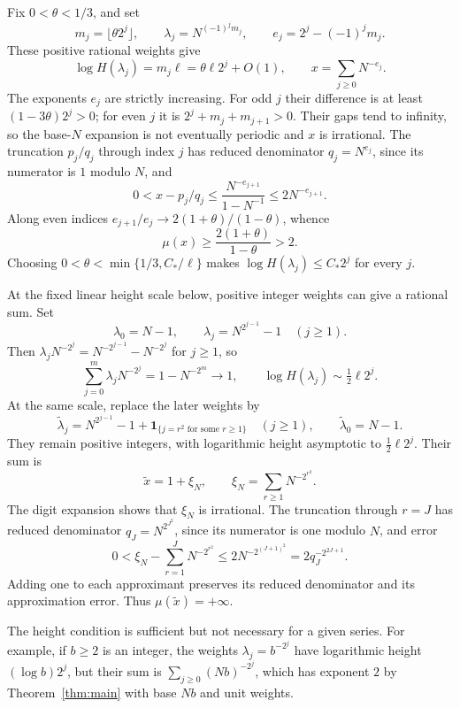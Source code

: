 \documentclass{amsart}
\numberwithin{equation}{section}
\begin{document}
Fix $0<\theta<1/3$, and set
\[
m_j=\lfloor\theta2^j\rfloor,\qquad
\lambda_j=N^{(-1)^jm_j},\qquad e_j=2^j-(-1)^jm_j.
\]
These positive rational weights give
\[
\log H(\lambda_j)=m_j\ell=\theta\ell2^j+O(1),\qquad
x=\sum_{j\ge0}N^{-e_j}.
\]
The exponents $e_j$ are strictly increasing. For odd $j$ their
difference is at least $(1-3\theta)2^j>0$; for even $j$ it is
$2^j+m_j+m_{j+1}>0$. Their gaps tend to infinity, so the base-$N$
expansion is not eventually periodic and $x$ is irrational.
The truncation $p_j/q_j$ through index $j$ has reduced denominator
$q_j=N^{e_j}$, since its numerator is $1$ modulo $N$, and
\[
0<x-p_j/q_j\le\frac{N^{-e_{j+1}}}{1-N^{-1}}
\le2N^{-e_{j+1}}.
\]
Along even indices $e_{j+1}/e_j\to2(1+\theta)/(1-\theta)$, whence
\begin{equation}\label{eq:sharpheight}
\mu(x)\ge\frac{2(1+\theta)}{1-\theta}>2.
\end{equation}
Choosing $0<\theta<\min\{1/3,C_*/\ell\}$ makes
$\log H(\lambda_j)\le C_*2^j$ for every $j$.

At the fixed linear height scale below, positive integer weights can give a
rational sum. Set
\[
\lambda_0=N-1,\qquad \lambda_j=N^{2^{j-1}}-1\quad(j\ge1).
\]
Then $\lambda_jN^{-2^j}=N^{-2^{j-1}}-N^{-2^j}$ for $j\ge1$, so
\[
\sum_{j=0}^m\lambda_jN^{-2^j}=1-N^{-2^m}\longrightarrow1,
\qquad \log H(\lambda_j)\sim\tfrac12\ell2^j.
\]
At the same scale, replace the later weights by
\[
\widetilde\lambda_j=N^{2^{j-1}}-1+
\boldsymbol1_{\{j=r^2\text{ for some }r\ge1\}}\quad(j\ge1),
\qquad\widetilde\lambda_0=N-1.
\]
They remain positive integers, with logarithmic height
asymptotic to $\tfrac12\ell2^j$. Their sum is
\[
\widetilde x=1+\xi_N,\qquad
\xi_N=\sum_{r\ge1}N^{-2^{r^2}}.
\]
The digit expansion shows that $\xi_N$ is irrational. The truncation
through $r=J$ has reduced denominator
$q_J=N^{2^{J^2}}$, since its numerator is one modulo $N$, and error
\[
0<\xi_N-\sum_{r=1}^JN^{-2^{r^2}}
\le2N^{-2^{(J+1)^2}}=2q_J^{-2^{2J+1}}.
\]
Adding one to each approximant preserves its reduced denominator and its
approximation error. Thus $\mu(\widetilde x)=+\infty$.

The height condition is sufficient but not necessary for a given series. For example,
if $b\ge2$ is an integer, the weights
$\lambda_j=b^{-2^j}$ have logarithmic height $(\log b)2^j$,
but their sum is $\sum_{j\ge0}(Nb)^{-2^j}$, which has exponent $2$
by Theorem~\ref{thm:main} with base $Nb$ and unit weights.
\end{document}
